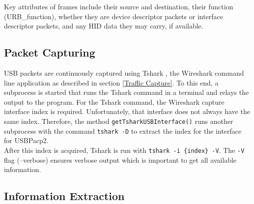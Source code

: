 Key attributes of frames include their source and destination, their function (URB\_function), whether they are device descriptor packets or interface descriptor packets, and any HID data they may carry, if available.


\subsection{Packet Capturing}

USB packets are continuously captured using Tshark \cite{TsharkTsharkDev}, the Wireshark command line application as described in section \ref{Traffic Capture}. To this end, a subprocess is started that runs the Tshark command in a terminal and relays the output to the program.
For the Tshark command, the Wireshark capture interface index is required. Unfortunately, that interface does not always have the same index. Therefore, the method \verb|getTsharkUSBInterface()| runs another subprocess with the command \verb|tshark -D| to extract the index for the interface for USBPacp2.  \\
After this index is acquired, Tshark is run with \verb|tshark -i {index} -V|. The \verb|-V| flag (--verbose) ensures verbose output which is important to get all available information.  


\subsection{Information Extraction}


